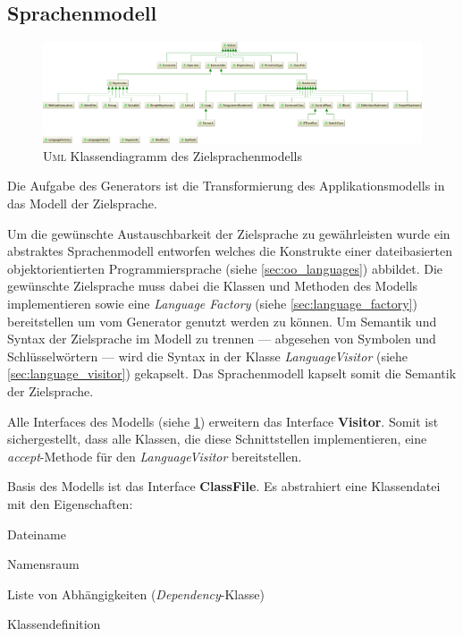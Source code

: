 \subsection{Sprachenmodell}
\label{sec:language_model}

\begin{figure}
    \centering
    \includegraphics[width=\textheight]{resources/languagemodel_common}
    \caption{\textsc{Uml} Klassendiagramm des Zielsprachenmodells}
    \label{fig:language_model}
\end{figure}

Die Aufgabe des Generators ist die Transformierung des Applikationsmodells in das Modell der Zielsprache. 

Um die gewünschte Austauschbarkeit der Zielsprache zu gewährleisten wurde ein abstraktes Sprachenmodell entworfen welches die Konstrukte einer dateibasierten objektorientierten Programmiersprache (siehe \cref{sec:oo_languages}) abbildet. 
Die gewünschte Zielsprache muss dabei die Klassen und Methoden des Modells implementieren sowie eine \emph{Language Factory} (siehe \cref{sec:language_factory}) bereitstellen um vom Generator genutzt werden zu können.
Um Semantik und Syntax der Zielsprache im Modell zu trennen --- abgesehen von Symbolen und Schlüsselwörtern --- wird die Syntax in der Klasse \emph{LanguageVisitor} (siehe \cref{sec:language_visitor}) gekapselt. Das Sprachenmodell kapselt somit die Semantik der Zielsprache.

Alle Interfaces des Modells (siehe \cref{fig:language_model}) erweitern das Interface \textbf{Visitor}. Somit ist sichergestellt, dass alle Klassen, die diese Schnittstellen implementieren, eine \emph{accept}-Methode für den \emph{LanguageVisitor} bereitstellen.

Basis des Modells ist das Interface \textbf{ClassFile}. Es abstrahiert eine Klassendatei mit den Eigenschaften:
\begin{compactitem}
    \item Dateiname
    \item Namensraum
    \item Liste von Abhängigkeiten (\emph{Dependency}-Klasse)
    \item Klassendefinition
\end{compactitem}

